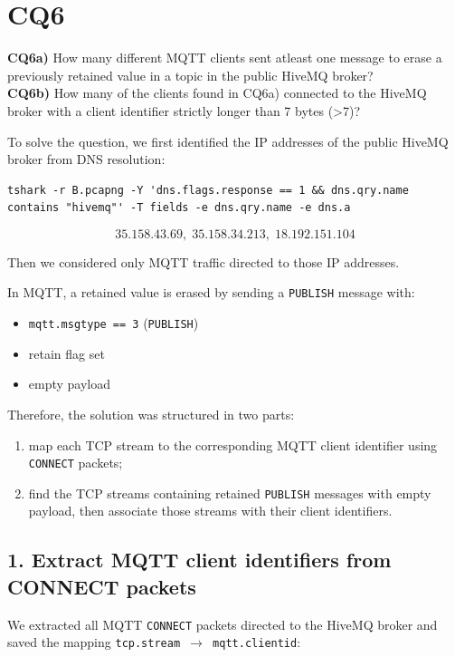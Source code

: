 \section{CQ6}

\begin{fancyquote}
    \textbf{CQ6a)} How many different MQTT clients sent atleast one message to erase a previously retained value in a topic in the public HiveMQ broker?\\
    \textbf{CQ6b)} How many of the clients found in CQ6a) connected to the HiveMQ broker with a client identifier strictly longer than 7 bytes (>7)?
\end{fancyquote}

To solve the question, we first identified the IP addresses of the public HiveMQ broker from DNS resolution:
\begin{lstlisting}
tshark -r B.pcapng -Y 'dns.flags.response == 1 && dns.qry.name contains "hivemq"' -T fields -e dns.qry.name -e dns.a
\end{lstlisting}
\[
35.158.43.69,\; 35.158.34.213,\; 18.192.151.104
\]

Then we considered only MQTT traffic directed to those IP addresses.

In MQTT, a retained value is erased by sending a \texttt{PUBLISH} message with:
\begin{itemize}
    \item \texttt{mqtt.msgtype == 3} (\texttt{PUBLISH})
    \item retain flag set
    \item empty payload
\end{itemize}

Therefore, the solution was structured in two parts:
\begin{enumerate}
    \item map each TCP stream to the corresponding MQTT client identifier using \texttt{CONNECT} packets;
    \item find the TCP streams containing retained \texttt{PUBLISH} messages with empty payload, then associate those streams with their client identifiers.
\end{enumerate}

\subsection*{1. Extract MQTT client identifiers from CONNECT packets}

We extracted all MQTT \texttt{CONNECT} packets directed to the HiveMQ broker and saved the mapping \texttt{tcp.stream $\rightarrow$ mqtt.clientid}:

